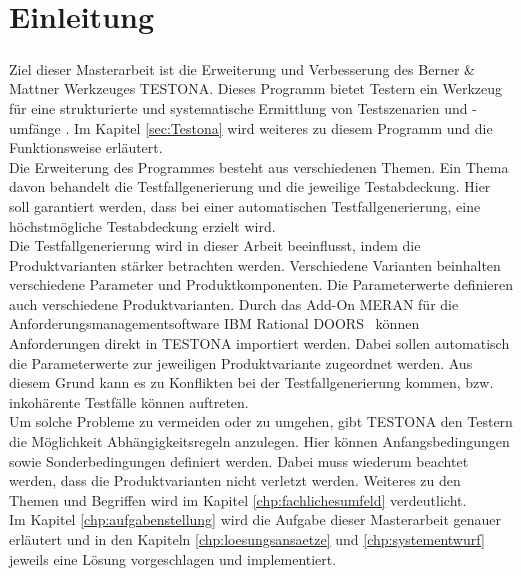 \chapter{Einleitung}\label{chp:einleitung}
\paragraph{}
Ziel dieser Masterarbeit ist die Erweiterung und Verbesserung des Berner \& Mattner Werkzeuges TESTONA. Dieses Programm bietet Testern ein Werkzeug für eine strukturierte und systematische Ermittlung von Testszenarien und -umfänge \cite{TESTONA}. Im Kapitel \ref{sec:Testona} wird weiteres zu diesem Programm und die Funktionsweise erläutert.\\

Die Erweiterung des Programmes besteht aus verschiedenen Themen. Ein Thema davon behandelt die Testfallgenerierung und die jeweilige Testabdeckung. Hier soll garantiert werden, dass bei einer automatischen Testfallgenerierung, eine höchstmögliche Testabdeckung erzielt wird.\\

Die Testfallgenerierung wird in dieser Arbeit beeinflusst, indem die Produktvarianten stärker betrachten werden. Verschiedene Varianten beinhalten verschiedene Parameter und Produktkomponenten. Die Parameterwerte definieren auch verschiedene Produktvarianten. Durch das Add-On MERAN für die Anforderungsmanagementsoftware \glqq IBM Rational DOORS\grqq~ können Anforderungen direkt in  TESTONA importiert werden. Dabei sollen automatisch die Parameterwerte zur jeweiligen Produktvariante zugeordnet werden. Aus diesem Grund kann es zu Konflikten bei der Testfallgenerierung kommen, bzw. inkohärente Testfälle können auftreten.\\

Um solche Probleme zu vermeiden oder zu umgehen, gibt TESTONA den Testern die Möglichkeit Abhängigkeitsregeln anzulegen. Hier können Anfangsbedingungen sowie Sonderbedingungen definiert werden. Dabei muss wiederum beachtet werden, dass die Produktvarianten nicht verletzt werden. Weiteres zu den Themen und Begriffen wird im Kapitel \ref{chp:fachlichesumfeld} verdeutlicht.\\

Im Kapitel \ref{chp:aufgabenstellung} wird die Aufgabe dieser Masterarbeit genauer erläutert und in den Kapiteln \ref{chp:loesungsansaetze} und \ref{chp:systementwurf} jeweils eine Lösung vorgeschlagen und implementiert.

